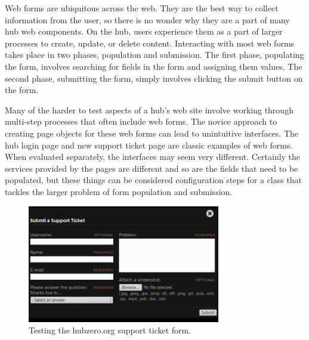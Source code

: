 Web forms are ubiquitous across the web. They are the best way to collect
information from the user, so there is no wonder why they are a part of many
hub web components. On the hub, users experience them as a part of larger
processes to create, update, or delete content. Interacting with most web forms
takes place in two phases, population and submission.  The first phase,
populating the form, involves searching for fields in the form and assigning
them values. The second phase, submitting the form, simply involves clicking
the submit button on the form.

Many of the harder to test aspects of a hub's web site involve working through
multi-step processes that often include web forms. The novice approach to
creating page objects for these web forms can lead to unintuitive interfaces.
The hub login page and new support ticket page are classic examples of web
forms. When evaluated separately, the interfaces may seem very different.
Certainly the services provided by the pages are different and so are the
fields that need to be populated, but these things can be considered
configuration steps for a class that tackles the larger problem of form
population and submission.

\begin{figure}[tbh]
  \centering
  \includegraphics[width=0.75\textwidth]
    {../../images/hubzero_dropdown_support_ticket_form.png}
  \caption{ Testing the hubzero.org support ticket form. }
  \label{fig:hubzero_dropdown_support_ticket_form}
\end{figure}



